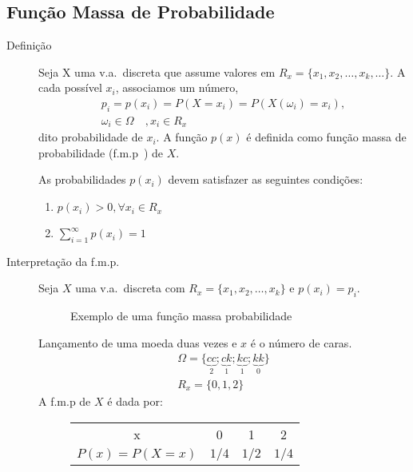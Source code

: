    \subsection{Função Massa de Probabilidade} 
   \begin{description}
     \item[Definição] Seja X uma v.a.\ discreta que assume valores em $R_{x}=\{x_1,x_2,\dots,
       x_{k},\dots\}$. A cada possível $x_{i}$, associamos um número, 
       \begin{align*}
         p_{i}=p(x_{i})=P(X=x_{i})=P(X( \omega_i)=x_i),\\
         \omega_{i} \in \Omega \quad , x_{i} \in R_{x} \nonumber
       \end{align*}
       dito probabilidade de $x_{i}$. A função $p(x)$ é definida como função massa de probabilidade 
       (f.m.p\ ) de $X$. 

       As probabilidades $p(x_i)$ devem satisfazer as seguintes condições: 
       \begin{enumerate}[label=(\roman*)]
         \item $p(x_i)>0, \forall x_i \in R_{x}$

         \item $\displaystyle \sum \limits^\infty_{i=1} p(x_i)=1$
       \end{enumerate}

     \item[Interpretação da f.m.p.\ ] 

       Seja $X$ uma v.a.\ discreta com $R_{x}= \{x_1,x_2,\dots,x_k \}$ e $p(x_i)=p_i$.

       \begin{figure}[H]
         \centering
         
         \caption{Exemplo de uma função massa probabilidade}
         \label{fig:24}
       \end{figure}

       \begin{example}
         Lançamento de uma moeda duas vezes e $x$ é o número de caras.
         \begin{align*}
           \Omega = \{ \underbrace{cc}_{2}; \underbrace{ck}_{1};\underbrace{kc}_{1};\underbrace{kk}_{0} \} \\
           R_{x}= \{0,1,2\}
         \end{align*}
         A f.m.p de $X$ é dada por: 
         \begin{figure} [H]
           \centering
           \begin{tabular}{ c c c c}
             \toprule
             x &0&1&2 \\ \cmidrule{1-4}
             $P(x)=P(X=x)$&$1/4$&$1/2$& $1/4$\\    \bottomrule
           \end{tabular}
           \label{tab:4}
         \end{figure}



\end{example}
\end{description}
